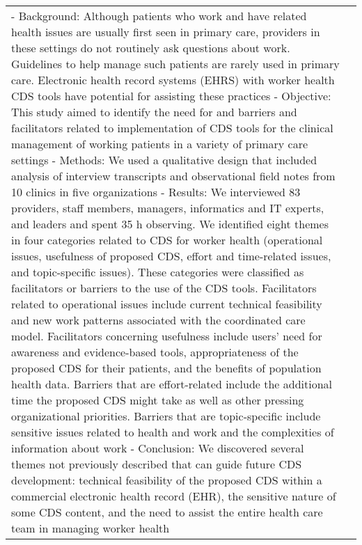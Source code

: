 \begin{landscape}
\begin{longtable}{p{3cm}p{}}
    - Background: Although patients who work and have related health issues are usually first seen in primary care, providers in these settings do not routinely ask questions about work.
    Guidelines to help manage such patients are rarely used in primary care.
    Electronic health record systems (EHRS) with worker health CDS tools have potential for assisting these practices
    - Objective: This study aimed to identify the need for and barriers and facilitators related to implementation of CDS tools for the clinical management of working patients in a variety of primary care settings
    - Methods: We used a qualitative design that included analysis of interview transcripts and observational field notes from 10 clinics in five organizations
    - Results: We interviewed 83 providers, staff members, managers, informatics and IT experts, and leaders and spent 35 h observing.
    We identified eight themes in four categories related to CDS for worker health (operational issues, usefulness of proposed CDS, effort and time-related issues, and topic-specific issues). These categories were classified as facilitators or barriers to the use of the CDS tools.
    Facilitators related to operational issues include current technical feasibility and new work patterns associated with the coordinated care model.
    Facilitators concerning usefulness include users' need for awareness and evidence-based tools, appropriateness of the proposed CDS for their patients, and the benefits of population health data.
    Barriers that are effort-related include the additional time the proposed CDS might take as well as other pressing organizational priorities.
    Barriers that are topic-specific include sensitive issues related to health and work and the complexities of information about work
    - Conclusion: We discovered several themes not previously described that can guide future CDS development: technical feasibility of the proposed CDS within a commercial electronic health record (EHR), the sensitive nature of some CDS content, and the need to assist the entire health care team in managing worker health


\end{longtable}
\end{landscape}
